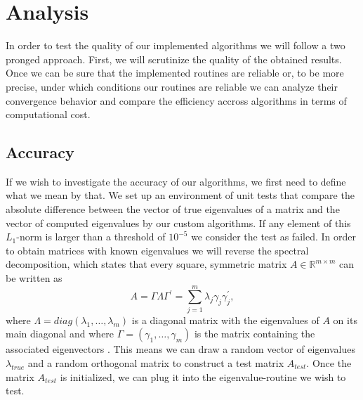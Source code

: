 \documentclass[12pt]{article}
\begin{document}
\section{Analysis}

In order to test the quality of our implemented algorithms we will follow a two pronged approach. First, we will scrutinize the quality of the obtained results. Once we can be sure that the implemented routines are reliable or, to be more precise, under which conditions our routines are reliable we can analyze their convergence behavior and compare the efficiency accross algorithms in terms of computational cost.
\subsection{Accuracy}

If we wish to investigate the accuracy of our algorithms, we first need to define what we mean by that. We set up an environment of unit tests that compare the absolute difference between the vector of true eigenvalues of a matrix and the vector of computed eigenvalues by our custom algorithms. If any element of this $L_1$-norm is larger than a threshold of $10^{-5}$ we consider the test as failed. In order to obtain matrices with known eigenvalues we will reverse the spectral decomposition, which states that every square, symmetric matrix $A \in \mathbb{R}^{m \times m}$ can be written as
\begin{equation}
\label{spectral-decomp}
A = \Gamma \Lambda \Gamma^{\prime} = \sum\limits_{j=1}^m \lambda_j \gamma_j \gamma^{\prime}_j,
\end{equation}
where $\Lambda = diag(\lambda_1, \dots, \lambda_m)$ is a diagonal matrix with the eigenvalues of $A$ on its main diagonal and where $\Gamma=(\gamma_1, \dots, \gamma_m)$ is the matrix containing the associated eigenvectors \cite{MVA}. This means we can draw a random vector of eigenvalues $\lambda_{true}$ and a random orthogonal matrix to construct a test matrix $A_{test}$. Once the matrix $A_{test}$ is initialized, we can plug it into the eigenvalue-routine we wish to test.
\end{document}
